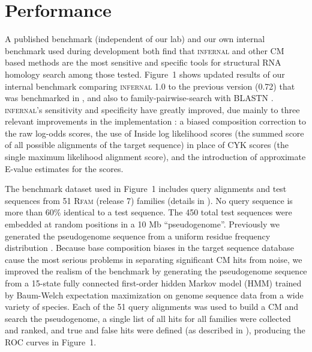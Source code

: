 \section{Performance}

A published benchmark (independent of our lab) \citep{Freyhult07} and
our own internal benchmark used during development
\citep{NawrockiEddy07} both find that \textsc{infernal} and other CM
based methods are the most sensitive and specific tools for structural
RNA homology search among those tested. Figure~1 shows updated results
of our internal benchmark comparing \textsc{infernal} 1.0 to the
previous version (0.72) that was benchmarked in \citet{Freyhult07},
and also to family-pairwise-search with BLASTN \citep{Altschul97,
Grundy98b}.  \textsc{infernal}'s sensitivity and specificity have
greatly improved, due mainly to three relevant improvements in the
implementation \citep{infguide03}: a biased composition correction to
the raw log-odds scores, the use of Inside log likelihood scores (the
summed score of all possible alignments of the target sequence) in
place of CYK scores (the single maximum likelihood alignment score),
and the introduction of approximate E-value estimates for the scores.

The benchmark dataset used in Figure~1 includes query alignments and
test sequences from 51 \textsc{Rfam} (release 7) families (details in
\citep{NawrockiEddy07}).  No query sequence is more than 60\% identical
to a test sequence.  The 450 total test sequences were embedded at
random positions in a 10 Mb ``pseudogenome''.  Previously we generated
the pseudogenome sequence from a uniform residue frequency
distribution \citep{NawrockiEddy07}.  Because base composition biases
in the target sequence database cause the most serious problems in
separating significant CM hits from noise, we improved the realism of
the benchmark by generating the pseudogenome sequence from a 15-state
fully connected first-order hidden Markov model (HMM) trained by
Baum-Welch expectation maximization \citep{Durbin98} on genome
sequence data from a wide variety of species.  Each of the 51 query
alignments was used to build a CM and search the pseudogenome, a
single list of all hits for all families were collected and ranked,
and true and false hits were defined (as described in
\citet{NawrockiEddy07}), producing the ROC curves in Figure~1.

